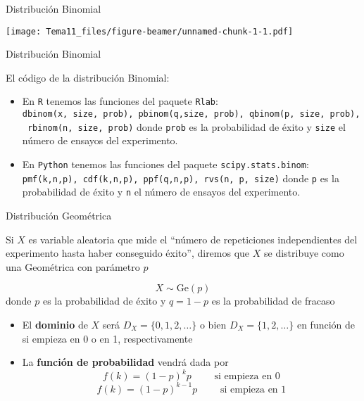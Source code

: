 \documentclass[
  ignorenonframetext,
]{beamer}
\providecommand{\tightlist}{%
  \setlength{\itemsep}{0pt}\setlength{\parskip}{0pt}}
\begin{document}
\begin{frame}{Distribución Binomial}
\protect\hypertarget{distribuciuxf3n-binomial-2}{}

\texttt{[image: Tema11\_files/figure-beamer/unnamed-chunk-1-1.pdf]}

\end{frame}

\begin{frame}[fragile]{Distribución Binomial}
\protect\hypertarget{distribuciuxf3n-binomial-3}{}

El código de la distribución Binomial:

\begin{itemize}
\tightlist
\item
  En \texttt{R} tenemos las funciones del paquete \texttt{Rlab}:
  \texttt{dbinom(x,\ size,\ prob),\ pbinom(q,size,\ prob),\ qbinom(p,\ size,\ prob),\ rbinom(n,\ size,\ prob)}
  donde \texttt{prob} es la probabilidad de éxito y \texttt{size} el
  número de ensayos del experimento.
\item
  En \texttt{Python} tenemos las funciones del paquete
  \texttt{scipy.stats.binom}:
  \texttt{pmf(k,n,p),\ cdf(k,n,p),\ ppf(q,n,p),\ rvs(n,\ p,\ size)}
  donde \texttt{p} es la probabilidad de éxito y \texttt{n} el número de
  ensayos del experimento.
\end{itemize}

\end{frame}

\begin{frame}{Distribución Geométrica}
\protect\hypertarget{distribuciuxf3n-geomuxe9trica}{}

Si \(X\) es variable aleatoria que mide el ``número de repeticiones
independientes del experimento hasta haber conseguido éxito'', diremos
que \(X\) se distribuye como una Geométrica con parámetro \(p\)

\[X\sim \text{Ge}(p)\] donde \(p\) es la probabilidad de éxito y
\(q = 1-p\) es la probabilidad de fracaso

\begin{itemize}
\item
  El \textbf{dominio} de \(X\) será \(D_X= \{0,1,2,\dots\}\) o bien
  \(D_X = \{1,2,\dots\}\) en función de si empieza en 0 o en 1,
  respectivamente
\item
  La \textbf{función de probabilidad} vendrá dada por
  \[f(k) = (1-p)^{k}p \qquad\text{ si empieza en 0}\]
  \[f(k) = (1-p)^{k-1}p \qquad\text{ si empieza en 1}\]
\end{itemize}

\end{frame}
\end{document}
